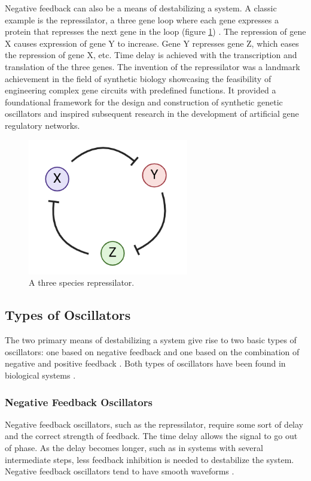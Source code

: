 \documentclass[12pt]{report}
\begin{document}
Negative feedback can also be a means of destabilizing a system. A classic example is the repressilator,  a three gene loop where each gene expresses a protein that represses the next gene in the loop (figure \ref{fig:repressilator}) \cite{Elowitz2000}. The repression of gene X causes expression of gene Y to increase. Gene Y represses gene Z, which eases the repression of gene X, etc. Time delay is achieved with the transcription and translation of the three genes. The invention of the repressilator was a landmark achievement in the field of synthetic biology showcasing the feasibility of engineering complex gene circuits with predefined functions. It provided a foundational framework for the design and construction of synthetic genetic oscillators and inspired subsequent research in the development of artificial gene regulatory networks.

\begin{figure}
    \centering
    \includegraphics[width=7cm]{images/repressilator.png}
    \caption[Three node repressilator]{A three species repressilator.}
    \label{fig:repressilator}
\end{figure}

\subsection{Types of Oscillators}
The two primary means of destabilizing a system give rise to two basic types of oscillators: one based on negative feedback and one based on the combination of negative and positive feedback \cite{sauro_network_2009}. Both types of oscillators have been found in biological systems \cite{Tyson2003}.

\subsubsection{Negative Feedback Oscillators}
Negative feedback oscillators, such as the repressilator, require some sort of delay and the correct strength of feedback. The time delay allows the signal to go out of phase.
As the delay becomes longer, such as in systems with several intermediate steps, less feedback inhibition is needed to destabilize the system. Negative feedback oscillators tend to have smooth waveforms \cite{sauro_network_2009}.
\end{document}
